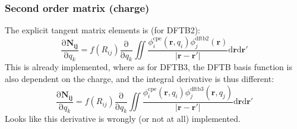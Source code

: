 \documentclass{article}
\numberwithin{equation}{section}
\begin{document}
\subsubsection{Second order matrix (charge)}
The explicit tangent matrix elements is (for DFTB2):
\begin{equation}
    \frac{\mathrm{\partial}\mathbf{N_{ij}}}{\mathrm{\partial}q_k} =
    f(R_{ij})\frac{\mathrm{\partial}}{\mathrm{\partial}q_k}  \iint \frac{\phi_i^\mathrm{cpe}\left(\mathbf{r}, q_i\right)\phi_j^\mathrm{dftb2}\left(\mathbf{r}\right)}{\left| \mathbf{r} - \mathbf{r'}\right|} \mathrm{d}\mathbf{r}\mathrm{d}\mathbf{r'}
\end{equation}
This is already implemented, where as for DFTB3, the DFTB basis function is also dependent on the charge, and the integral derivative is thus different:
\begin{equation}
    \frac{\mathrm{\partial}\mathbf{N_{ij}}}{\mathrm{\partial}q_k} =
    f(R_{ij})\frac{\mathrm{\partial}}{\mathrm{\partial}q_k}  \iint \frac{\phi_i^\mathrm{cpe}\left(\mathbf{r}, q_i\right)\phi_j^\mathrm{dftb3}\left(\mathbf{r}, q_j\right)}{\left| \mathbf{r} - \mathbf{r'}\right|} \mathrm{d}\mathbf{r}\mathrm{d}\mathbf{r'}
\end{equation}
Looks like this derivative is wrongly (or not at all) implemented.




\end{document}
